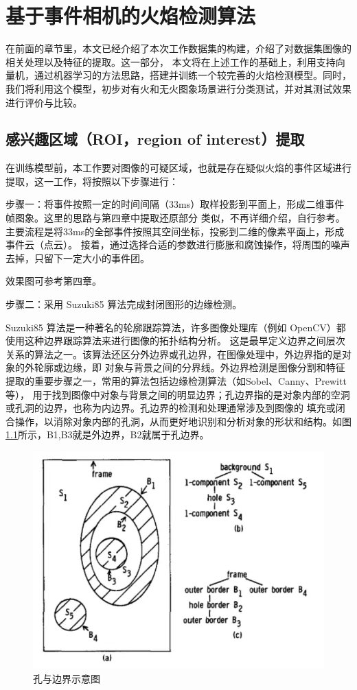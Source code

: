 
\chapter{基于事件相机的火焰检测算法}
在前面的章节里，本文已经介绍了本次工作数据集的构建，介绍了对数据集图像的相关处理以及特征的提取。这一部分，
本文将在上述工作的基础上，利用支持向量机，通过机器学习的方法思路，搭建并训练一个较完善的火焰检测模型。同时，
我们将利用这个模型，初步对有火和无火图象场景进行分类测试，并对其测试效果进行评价与比较。

\section{感兴趣区域（ROI，region of interest）提取}
在训练模型前，本工作要对图像的可疑区域，也就是存在疑似火焰的事件区域进行提取，这一工作，将按照以下步骤进行：

步骤一：将事件按照一定的时间间隔（33ms）取样投影到平面上，形成二维事件帧图象。这里的思路与第四章中提取还原部分
类似，不再详细介绍，自行参考。主要流程是将33ms的全部事件按照其空间坐标，投影到二维的像素平面上，形成事件云（点云）。
接着，通过选择合适的参数进行膨胀和腐蚀操作，将周围的噪声去掉，只留下一定大小的事件团。

效果图可参考第四章。

步骤二：采用 Suzuki85 算法完成封闭图形的边缘检测。

Suzuki85 算法是一种著名的轮廓跟踪算法\cite{suzuki1985topological}，许多图像处理库（例如 OpenCV）都使用这种边界跟踪算法来进行图像的拓扑结构分析。
这是最早定义边界之间层次关系的算法之一。该算法还区分外边界或孔边界，在图像处理中，外边界指的是对象的外轮廓或边缘，即
对象与背景之间的分界线。外边界检测是图像分割和特征提取的重要步骤之一，常用的算法包括边缘检测算法（如Sobel、Canny、Prewitt等），
用于找到图像中对象与背景之间的明显边界；孔边界指的是对象内部的空洞或孔洞的边界，也称为内边界。孔边界的检测和处理通常涉及到图像的
填充或闭合操作，以消除对象内部的孔洞，从而更好地识别和分析对象的形状和结构。如图\ref{17}所示，B1,B3就是外边界，B2就属于孔边界。
\begin{figure}[ht]
    \centering
    \includegraphics[width=\textwidth]{figures/algorithm_boundary.png}
    \caption{孔与边界示意图}
    \label{17}
\end{figure}

